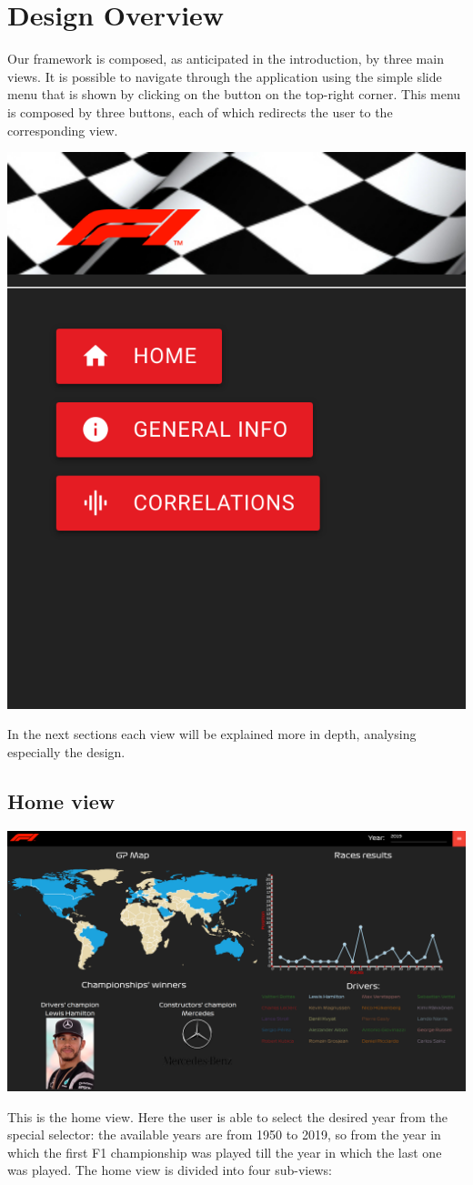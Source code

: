 \documentclass[11pt,twocolumn,letterpaper]{article}
\begin{document}
\section{Design Overview}

Our framework is composed, as anticipated in the introduction, by three main views. It is possible to navigate through the application using the simple slide menu that is shown by clicking on the button on the top-right corner. This menu is composed by three buttons, each of which redirects the user to the corresponding view.
\begin{center}
	\centering
	\includegraphics[width=0.3\columnwidth]{menu}
\end{center}
In the next sections each view will be explained more in depth, analysing especially the design.

\subsection{Home view}
\begin{center}
	\centering
	\includegraphics[width=\columnwidth]{home}
\end{center}

This is the home view. Here the user is able to select the desired year from the special selector: the available years are from 1950 to 2019, so from the year in which the first F1 championship was played till the year in which the last one was played. The home view is divided into four sub-views:
\end{document}
